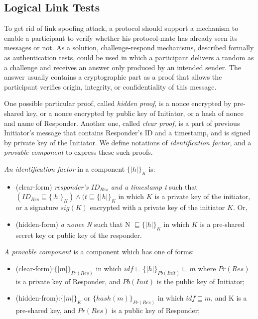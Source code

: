 \subsection{Logical Link Tests}

To get rid of link spoofing attack, a protocol should support a mechanism to enable a participant to verify whether his protocol-mate has already seen its messages or not. As a solution, challenge-respond mechanisms, described formally as authentication tests, could be used in which a participant delivers a random as a challenge and receives an answer only produced by an intended sender. The answer usually contains a cryptographic part as a proof that allows the participant verifies origin, integrity, or confidentiality of this message. 

One possible particular proof, called \textit{hidden proof}, is a nonce encrypted by pre-shared key, or a nonce encrypted by public key of Initiator, or a hash of nonce and name of Responder. Another one, called \textit{clear proof}, is a part of previous Initiator's message that contains Responder's ID and a timestamp, and is signed by private key of the Initiator. We define notations of \emph{identification factor}, and a \emph{provable component} to express these such proofs. 

\begin{Definition} \emph{An identification factor} in a component $\{|h|\}_K$ is:
\begin{itemize}
	\item(clear-form) \emph{responder's $ID_{Res}$ and a timestamp t} such that $(ID_{Res} \sqsubseteq \{|h|\}_K ) \wedge (t \sqsubseteq \{|h|\}_K$ in which $K$ is a private key of the initiator, or a signature $sig(K)$ encrypted with a private key of the initiator $K$. Or, 
	\item(hidden-form) \emph{a nonce N} such that N $\sqsubseteq \{|h|\}_K$ in which $K$ is a pre-shared secret key or public key of the responder.\end{itemize}
\end{Definition}

\begin{Definition}\emph{A provable component} is a component which has one of forms:
\begin{itemize}
	\item (clear-form):$\{|m|\}_{Pr(Res)}$ in which $idf \sqsubseteq \{|h|\}_{Pb(Init)} \sqsubseteq m$ where $Pr(Res)$ is a private key of Responder, and $Pb(Init)$ is the public key of Initiator;  
	\item (hidden-from):$\{|m|\}_K$ or $\{hash(m)\}_{Pr(Res)}$ in which $idf \sqsubseteq m$, and K is a pre-shared key, and $Pr(Res)$ is a public key of Responder;
\end{itemize}
\end{Definition}


